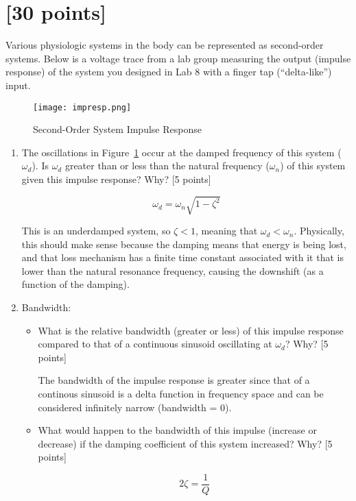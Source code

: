 

\section{[30 points]}

Various physiologic systems in the body can be represented as second-order
systems.  Below is a voltage trace from a lab group measuring the output
(impulse response) of the system you designed in Lab 8 with a finger tap
(``delta-like'') input.

\begin{figure}[htb!]
\centering
\texttt{[image: impresp.png]}
\caption{Second-Order System Impulse Response}
\label{fig:impresp}
\end{figure}

\begin{enumerate}

\item The oscillations in Figure~\ref{fig:impresp} occur at the damped
frequency of this system ($\omega_d$).  Is $\omega_d$ greater than or less than
the natural frequency ($\omega_n$) of this system given this impulse response?
Why? [5 points]

$$\omega_d = \omega_n \sqrt{1-\zeta^2}$$

This is an underdamped system, so $\zeta < 1$, meaning that $\omega_d < \omega_n$.  Physically, this should make sense because the damping means that energy is being lost, and that loss mechanism has a finite time constant associated with it that is lower than the natural resonance frequency, causing the downshift (as a function of the damping).

\item Bandwidth:
\begin{itemize}
    \item What is the relative bandwidth (greater or less) of this impulse
response compared to that of a continuous sinusoid oscillating at $\omega_d$?
Why? [5 points]

The bandwidth of the impulse response is greater since that of a continous
sinusoid is a delta function in frequency space and can be considered
infinitely narrow (bandwidth = 0).

    \item What would happen to the bandwidth of this impulse (increase or decrease) if the damping coefficient of this system increased?  Why?  [5 points]

$$2\zeta = \frac{1}{Q}$$


\end{itemize}
\end{enumerate}
